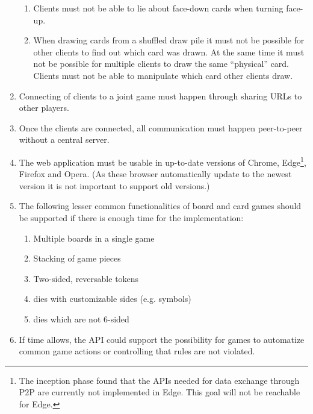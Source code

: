 \begin{enumerate}
\begin{enumerate}
    \item Clients must not be able to lie about \gls{face}-down cards when
    turning \gls{face}-up.
    \item When drawing cards from a shuffled \gls{draw pile} it must not be
    possible for other clients to find out which card was drawn. At the same
    time it must not be possible for multiple clients to draw the same
    ``physical'' card. Clients must not be able to manipulate which card other
    clients draw.
  \end{enumerate}
  \item Connecting of clients to a joint game must happen through sharing URLs
  to other players.
  \item Once the clients are connected, all communication must happen
  \gls{peer-to-peer} without a central server.
  \item The web application must be usable in up-to-date versions of Chrome,
  Edge\footnote{The inception phase found that the APIs needed for data
  exchange through \gls{P2P} are currently not implemented in Edge. This goal
  will not be reachable for Edge.}, Firefox and Opera. (As these browser
  automatically update to the newest version it is not important to support old
  versions.)
  \item The following lesser common functionalities of board and card games
  should be supported if there is enough time for the implementation:
  \begin{enumerate}
    \item Multiple boards in a single game
    \item Stacking of game pieces
    \item Two-sided, reversable tokens
    \item \Glspl{die} with customizable sides (e.g. symbols)
    \item \Glspl{die} which are not 6-sided
  \end{enumerate}
  \item If time allows, the API could support the possibility for games to
  automatize common game actions or controlling that rules are not violated.
\end{enumerate}
